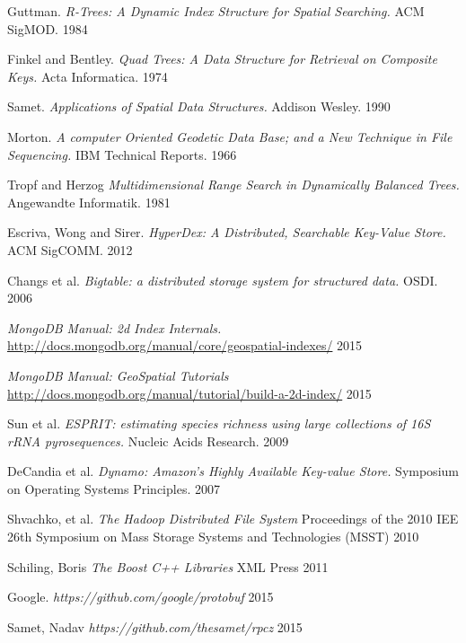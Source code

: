 \documentclass[11pt]{article}
\begin{document}
\begin{thebibliography}{99}

  Guttman.
  \emph{R-Trees: A Dynamic Index Structure for Spatial Searching.}
  ACM SigMOD.
  1984

  Finkel and Bentley.
  \emph{Quad Trees: A Data Structure for Retrieval on Composite Keys.}
  Acta Informatica.
  1974

  Samet.
  \emph{Applications of Spatial Data Structures.}
  Addison Wesley.
  1990

  Morton.
  \emph{A computer Oriented Geodetic Data Base; and a New Technique in File Sequencing.}
  IBM Technical Reports. 
  1966

 Tropf and Herzog
 \emph{Multidimensional Range Search in Dynamically Balanced Trees.}
 Angewandte Informatik.
 1981

  Escriva, Wong and Sirer.
  \emph{HyperDex: A Distributed, Searchable Key-Value Store.}
  ACM SigCOMM.
  2012

  Changs et al.
  \emph{Bigtable: a distributed storage system for structured data.}
  OSDI.
  2006

  \emph{MongoDB Manual: 2d Index Internals.}
  \url{http://docs.mongodb.org/manual/core/geospatial-indexes/}
  2015


  \emph{MongoDB Manual: GeoSpatial Tutorials}
  \url{http://docs.mongodb.org/manual/tutorial/build-a-2d-index/}
  2015

  Sun et al.
  \emph{ESPRIT: estimating species richness using large collections of 16S rRNA pyrosequences.}
  Nucleic Acids Research.
  2009


  DeCandia et al.
  \emph{Dynamo: Amazon’s Highly Available Key-value Store.}
  Symposium on Operating Systems Principles.
  2007

Shvachko, et al.
\emph{The Hadoop Distributed File System}
Proceedings of the 2010 IEE 26th Symposium on Mass Storage Systems and Technologies (MSST)
2010

Schiling, Boris
\emph{The Boost C++ Libraries}
XML Press
2011

Google.
\emph{https://github.com/google/protobuf}
2015

Samet, Nadav
\emph{https://github.com/thesamet/rpcz}
2015

\end{thebibliography}
\end{document}
